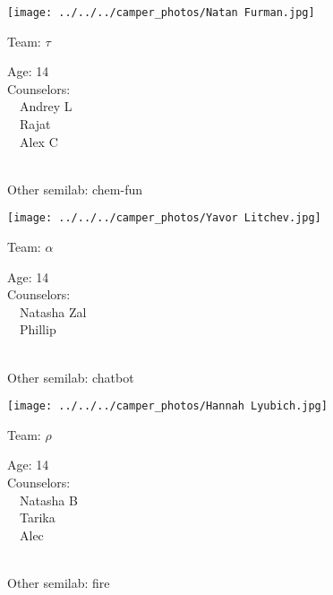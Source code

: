 \documentclass[10pt,letterpaper, landscape]{article}
\begin{document}
\verticalshiftfornextsticker
\renewcommand{\baselinestretch}{1} \begin{sticker}
\noindent\begin{minipage}{0.5\textwidth}\texttt{[image: ../../../camper\_photos/Natan Furman.jpg]}\end{minipage}\begin{minipage}{0.45\textwidth}
Team: {\Large $\tau$}

Age:        14\\
Counselors: \\\ \ Andrey L\\\ \ Rajat\\\ \ Alex C\\
\end{minipage} \\ \vspace{0.07in}
Other semilab: chem-fun
\end{sticker}
\horizontalshiftfornextsticker
\renewcommand{\baselinestretch}{1} \begin{sticker}
\noindent\begin{minipage}{0.5\textwidth}\texttt{[image: ../../../camper\_photos/Yavor Litchev.jpg]}\end{minipage}\begin{minipage}{0.45\textwidth}
Team: {\Large $\alpha$}

Age:        14\\
Counselors: \\\ \ Natasha Zal\\\ \ Phillip\\
\end{minipage} \\ \vspace{0.07in}
Other semilab: chatbot
\end{sticker}
\horizontalshiftfornextsticker
\renewcommand{\baselinestretch}{1} \begin{sticker}
\noindent\begin{minipage}{0.5\textwidth}\texttt{[image: ../../../camper\_photos/Hannah Lyubich.jpg]}\end{minipage}\begin{minipage}{0.45\textwidth}
Team: {\Large $\rho$}

Age:        14\\
Counselors: \\\ \ Natasha B\\\ \ Tarika\\\ \ Alec\\
\end{minipage} \\ \vspace{0.07in}
Other semilab: fire
\end{sticker}
\end{document}
